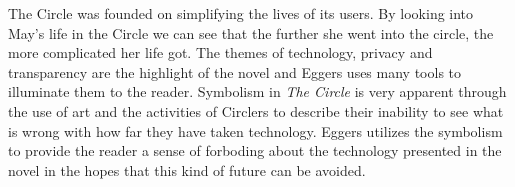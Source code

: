 The Circle was founded on simplifying the lives of its users.
By looking into May's life in the Circle we can see that the further she went into the circle, the more complicated her life got.
The themes of technology, privacy and transparency are the highlight of the novel and Eggers uses many tools to illuminate them to the reader.
Symbolism in \textit{The Circle} is very apparent through the use of art and the activities of Circlers to describe their inability to see what is wrong with how far they have taken technology.
Eggers utilizes the symbolism to provide the reader a sense of forboding about the technology presented in the novel in the hopes that this kind of future can be avoided.